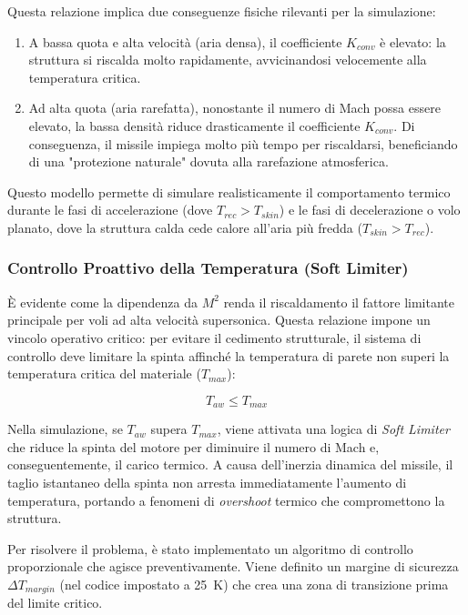 \documentclass[12pt,a4paper]{article}
\begin{document}
Questa relazione implica due conseguenze fisiche rilevanti per la simulazione:
\begin{enumerate}
    \item A bassa quota e alta velocità (aria densa), il coefficiente $K_{conv}$ è elevato: la struttura si riscalda molto rapidamente, avvicinandosi velocemente alla temperatura critica.
    \item Ad alta quota (aria rarefatta), nonostante il numero di Mach possa essere elevato, la bassa densità riduce drasticamente il coefficiente $K_{conv}$. Di conseguenza, il missile impiega molto più tempo per riscaldarsi, beneficiando di una "protezione naturale" dovuta alla rarefazione atmosferica.
\end{enumerate}

Questo modello permette di simulare realisticamente il comportamento termico durante le fasi di accelerazione (dove $T_{rec} > T_{skin}$) e le fasi di decelerazione o volo planato, dove la struttura calda cede calore all'aria più fredda ($T_{skin} > T_{rec}$).

\subsubsection{Controllo Proattivo della Temperatura (Soft Limiter)}
È evidente come la dipendenza da $M^2$ renda il riscaldamento il fattore limitante principale per voli ad alta velocità supersonica.
Questa relazione impone un vincolo operativo critico: per evitare il cedimento strutturale, il sistema di controllo deve limitare la spinta affinché la temperatura di parete non superi la temperatura critica del materiale ($T_{max}$):

\begin{equation}
    T_{aw} \le T_{max}
\end{equation}

Nella simulazione, se $T_{aw}$ supera $T_{max}$, viene attivata una logica di \textit{Soft Limiter} che riduce la spinta del motore per diminuire il numero di Mach e, conseguentemente, il carico termico.
A causa dell'inerzia dinamica del missile, il taglio istantaneo della spinta non arresta immediatamente l'aumento di temperatura, portando a fenomeni di \textit{overshoot} termico che compromettono la struttura.

Per risolvere il problema, è stato implementato un algoritmo di controllo proporzionale che agisce preventivamente. Viene definito un margine di sicurezza $\Delta T_{margin}$ (nel codice impostato a \SI{25}{K}) che crea una zona di transizione prima del limite critico.
\end{document}
